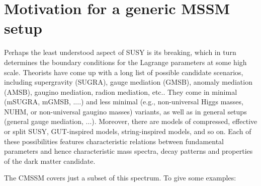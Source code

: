 \section{Motivation for a generic MSSM setup}
\label{sec:motivation}

Perhaps the least understood aspect of SUSY is its breaking, 
which in turn determines the boundary conditions for the Lagrange 
parameters at some high scale. Theorists have come up with a 
long list of possible candidate scenarios, including 
supergravity (SUGRA), 
gauge mediation (GMSB), 
anomaly mediation (AMSB), 
gaugino mediation, radion mediation, etc.. 
They come in minimal (mSUGRA, mGMSB, ....) and  
less minimal (e.g., non-universal Higgs masses, NUHM,  
or non-universal gaugino masses) variants, as well as in general setups 
(general gauge mediation, ...). 
Moreover, there are models of compressed, effective or split SUSY, 
GUT-inspired models, string-inspired models, and so on. 
Each of these possibilities features characteristic relations between 
fundamental parameters and hence characteristic mass spectra, decay 
patterns and properties of the dark matter candidate. 

The CMSSM covers just a subset of this spectrum. To give some 
examples:

